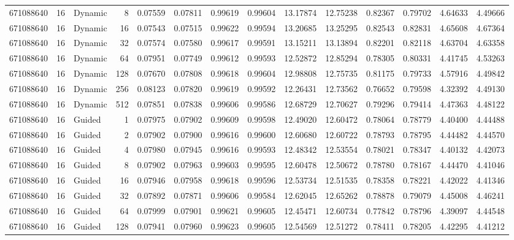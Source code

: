 \begin{tabular}{rrlrrrrrrrrrrr}
671088640 & 16 & Dynamic & 8 & 0.07559 & 0.07811 & 0.99619 & 0.99604 & 13.17874 & 12.75238 & 0.82367 & 0.79702 & 4.64633 & 4.49666 \\
671088640 & 16 & Dynamic & 16 & 0.07543 & 0.07515 & 0.99622 & 0.99594 & 13.20685 & 13.25295 & 0.82543 & 0.82831 & 4.65608 & 4.67364 \\
671088640 & 16 & Dynamic & 32 & 0.07574 & 0.07580 & 0.99617 & 0.99591 & 13.15211 & 13.13894 & 0.82201 & 0.82118 & 4.63704 & 4.63358 \\
671088640 & 16 & Dynamic & 64 & 0.07951 & 0.07749 & 0.99612 & 0.99593 & 12.52872 & 12.85294 & 0.78305 & 0.80331 & 4.41745 & 4.53263 \\
671088640 & 16 & Dynamic & 128 & 0.07670 & 0.07808 & 0.99618 & 0.99604 & 12.98808 & 12.75735 & 0.81175 & 0.79733 & 4.57916 & 4.49842 \\
671088640 & 16 & Dynamic & 256 & 0.08123 & 0.07820 & 0.99619 & 0.99592 & 12.26431 & 12.73562 & 0.76652 & 0.79598 & 4.32392 & 4.49130 \\
671088640 & 16 & Dynamic & 512 & 0.07851 & 0.07838 & 0.99606 & 0.99586 & 12.68729 & 12.70627 & 0.79296 & 0.79414 & 4.47363 & 4.48122 \\
671088640 & 16 & Guided & 1 & 0.07975 & 0.07902 & 0.99609 & 0.99598 & 12.49020 & 12.60472 & 0.78064 & 0.78779 & 4.40400 & 4.44488 \\
671088640 & 16 & Guided & 2 & 0.07902 & 0.07900 & 0.99616 & 0.99600 & 12.60680 & 12.60722 & 0.78793 & 0.78795 & 4.44482 & 4.44570 \\
671088640 & 16 & Guided & 4 & 0.07980 & 0.07945 & 0.99616 & 0.99593 & 12.48342 & 12.53554 & 0.78021 & 0.78347 & 4.40132 & 4.42073 \\
671088640 & 16 & Guided & 8 & 0.07902 & 0.07963 & 0.99603 & 0.99595 & 12.60478 & 12.50672 & 0.78780 & 0.78167 & 4.44470 & 4.41046 \\
671088640 & 16 & Guided & 16 & 0.07946 & 0.07958 & 0.99618 & 0.99596 & 12.53734 & 12.51535 & 0.78358 & 0.78221 & 4.42022 & 4.41346 \\
671088640 & 16 & Guided & 32 & 0.07892 & 0.07871 & 0.99606 & 0.99584 & 12.62045 & 12.65262 & 0.78878 & 0.79079 & 4.45008 & 4.46241 \\
671088640 & 16 & Guided & 64 & 0.07999 & 0.07901 & 0.99621 & 0.99605 & 12.45471 & 12.60734 & 0.77842 & 0.78796 & 4.39097 & 4.44548 \\
671088640 & 16 & Guided & 128 & 0.07941 & 0.07960 & 0.99623 & 0.99605 & 12.54569 & 12.51272 & 0.78411 & 0.78205 & 4.42295 & 4.41212 \\

\end{tabular}
